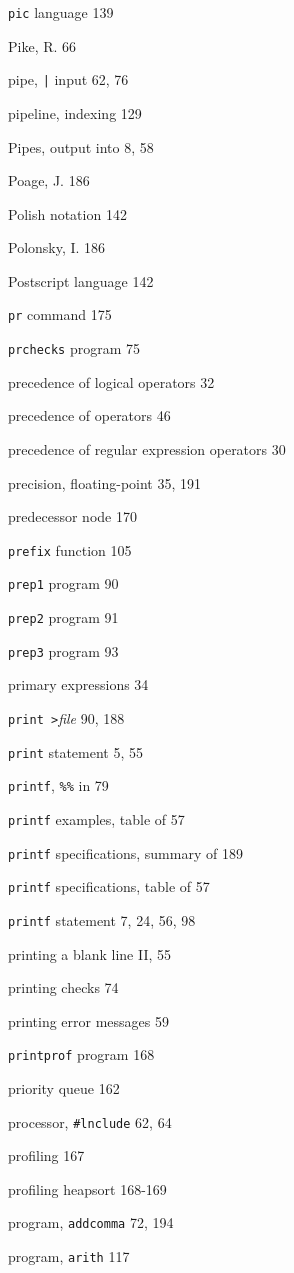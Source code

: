 \begin{multicols}{3}
\verb'pic' language 139

Pike, R. 66

pipe, \verb'|' input 62, 76

pipeline, indexing 129

Pipes, output into 8, 58

Poage, J. 186

Polish notation 142

Polonsky, I. 186

Postscript language 142

\verb'pr' command 175

\verb'prchecks' program 75

precedence of logical operators 32

precedence of operators 46

precedence of regular expression operators 30

precision, floating-point 35, 191

predecessor node 170

\verb'prefix' function 105

\verb'prep1' program 90

\verb'prep2' program 91

\verb'prep3' program 93

primary expressions 34

\verb'print >'\textit{file} 90, 188

\verb'print' statement 5, 55

\verb'printf', \verb'%%' in 79

\verb'printf' examples, table of 57

\verb'printf' specifications, summary of 189


\verb'printf' specifications, table of 57


\verb'printf' statement 7, 24, 56, 98

printing a blank line II, 55

printing checks 74

printing error messages 59

\verb'printprof' program 168

priority queue 162

processor, \verb'#lnclude' 62, 64

profiling 167

profiling heapsort 168-169

program, \verb'addcomma' 72, 194

program, \verb'arith' 117


\end{multicols}
